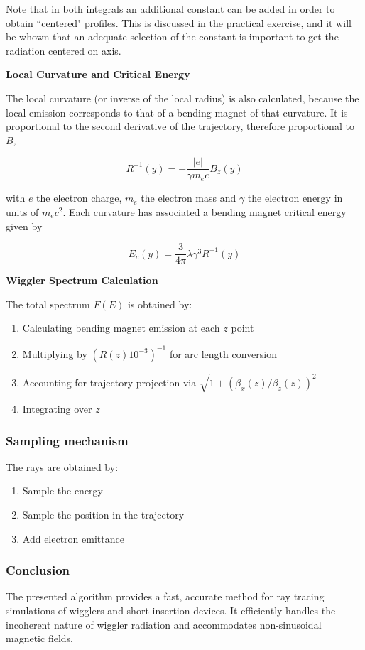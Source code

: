 Note that in both integrals an additional constant can be added in order to obtain ``centered" profiles. This is discussed in the practical exercise, and it will be whown that an adequate selection of the constant is important to get the radiation centered on axis. 

\textbf{Local Curvature and Critical Energy}

The local curvature (or inverse of the local radius) is also
calculated, because the local emission corresponds to that of
a bending magnet of that curvature. It is proportional to the
second derivative of the trajectory, therefore proportional to $B_z$

\begin{equation}
R^{-1}(y) = -\frac{|e|}{\gamma m_e c} B_z(y)
\end{equation}

with $e$ the electron charge, $m_e$ the electron mass and $\gamma$ the
electron energy in units of $m_e c^2$. Each curvature has associated a bending magnet critical energy given by

\begin{equation}
E_c(y) = \frac{3}{4\pi} \lambda \gamma^3 R^{-1}(y)
\end{equation}

\textbf{Wiggler Spectrum Calculation}

The total spectrum $F(E)$ is obtained by:
\begin{enumerate}
    \item Calculating bending magnet emission at each $z$ point
    \item Multiplying by $(R(z)10^{-3})^{-1}$ for arc length conversion
    \item Accounting for trajectory projection via $\sqrt{1 + (\beta_x(z)/\beta_z(z))^2}$
    \item Integrating over $z$
\end{enumerate}


\subsubsection{Sampling mechanism}

The rays are obtained by:
\begin{enumerate}
    \item Sample the energy
    \item Sample the position in the trajectory
    \item Add electron emittance
\end{enumerate}

\subsubsection{Conclusion}

The presented algorithm provides a fast, accurate method for ray tracing simulations of wigglers and short insertion devices. It efficiently handles the incoherent nature of wiggler radiation and accommodates non-sinusoidal magnetic fields.
